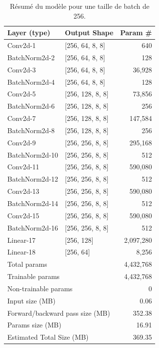 \begin{table}[H]
    \centering
    \caption{Résumé du modèle pour une taille de batch de 256.}
    \begin{tabular}{@{}llr@{}} %
    \toprule
    \textbf{Layer (type)} & \textbf{Output Shape} & \textbf{Param \#} \\
    \midrule
    Conv2d-1 & [256, 64, 8, 8] & 640 \\
    BatchNorm2d-2 & [256, 64, 8, 8] & 128 \\
    Conv2d-3 & [256, 64, 8, 8] & 36,928 \\
    BatchNorm2d-4 & [256, 64, 8, 8] & 128 \\
    Conv2d-5 & [256, 128, 8, 8] & 73,856 \\
    BatchNorm2d-6 & [256, 128, 8, 8] & 256 \\
    Conv2d-7 & [256, 128, 8, 8] & 147,584 \\
    BatchNorm2d-8 & [256, 128, 8, 8] & 256 \\
    Conv2d-9 & [256, 256, 8, 8] & 295,168 \\
    BatchNorm2d-10 & [256, 256, 8, 8] & 512 \\
    Conv2d-11 & [256, 256, 8, 8] & 590,080 \\
    BatchNorm2d-12 & [256, 256, 8, 8] & 512 \\
    Conv2d-13 & [256, 256, 8, 8] & 590,080 \\
    BatchNorm2d-14 & [256, 256, 8, 8] & 512 \\
    Conv2d-15 & [256, 256, 8, 8] & 590,080 \\
    BatchNorm2d-16 & [256, 256, 8, 8] & 512 \\
    Linear-17 & [256, 128] & 2,097,280 \\
    Linear-18 & [256, 64] & 8,256 \\
    \midrule
    \multicolumn{2}{l}{Total params} & 4,432,768 \\
    \multicolumn{2}{l}{Trainable params} & 4,432,768 \\
    \multicolumn{2}{l}{Non-trainable params} & 0 \\
    \midrule
    \multicolumn{2}{l}{Input size (MB)} & 0.06 \\
    \multicolumn{2}{l}{Forward/backward pass size (MB)} & 352.38 \\
    \multicolumn{2}{l}{Params size (MB)} & 16.91 \\
    \multicolumn{2}{l}{Estimated Total Size (MB)} & 369.35 \\
    \bottomrule
    \end{tabular}
    \label{tab:model_summary}
\end{table}

